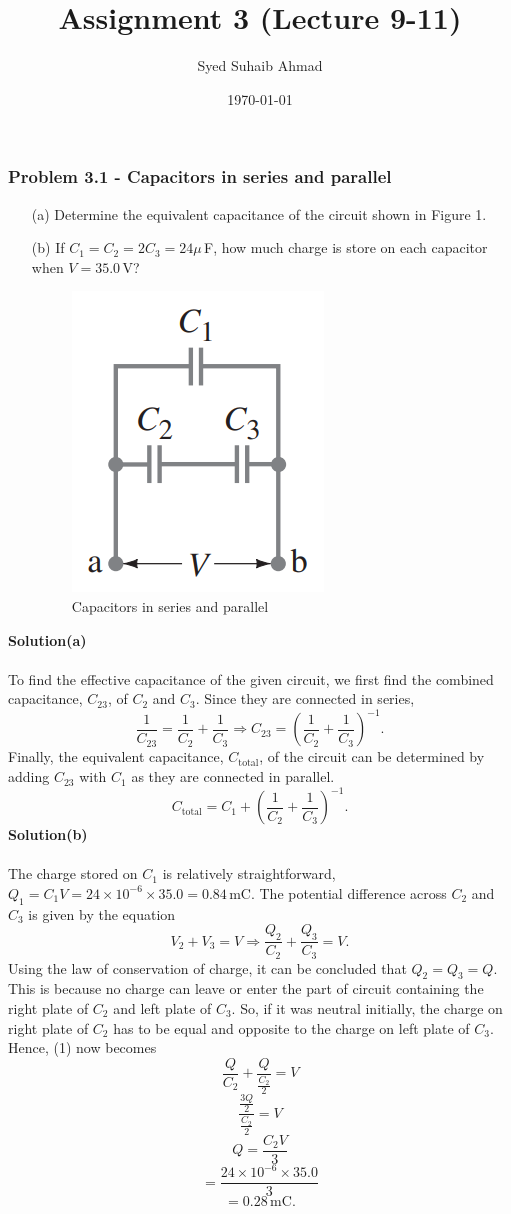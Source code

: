 \documentclass{article}
\title{Assignment \textbf{3} (Lecture 9-11)
}
\author{Syed Suhaib Ahmad}
\date{\today}
\begin{document}
\maketitle


\subsubsection*{Problem 3.1 - Capacitors in series and parallel}
\begin{enumerate}
    \item[(a)]Determine the equivalent capacitance of the circuit
shown in Figure 1.
    \item[(b)]If $C_1=C_2=2C_3=24\mu\,$F, how much charge is store on each capacitor when $V=35.0\,$V?
    \begin{figure}[h]
        \centering
        \includegraphics[width=0.2\linewidth]{figs/fig_prob_3.1.png}
        \caption{Capacitors in series and parallel}
        \label{fig: }
    \end{figure}
\end{enumerate}
\textbf{Solution(a)}
\\
\\To find the effective capacitance of the given circuit, we first find the combined capacitance, $C_{23}$, of $C_2$ and $C_3$. Since they are connected in series,
\[\frac{1}{C_{23}}=\frac{1}{C_2}+\frac{1}{C_3}\Rightarrow C_{23}=\left(\frac{1}{C_2}+\frac{1}{C_3}\right)^{-1}.\]
Finally, the equivalent capacitance, $C_{\text{total}}$, of the circuit can be determined by adding $C_{23}$ with $C_1$ as they are connected in parallel.
\[C_{\text{total}}=C_1+\left(\frac{1}{C_2}+\frac{1}{C_3}\right)^{-1}.\]
\textbf{Solution(b)}
\\
\\The charge stored on $C_1$ is relatively straightforward, $Q_1=C_1V=24\times10^{-6}\times35.0=0.84\,$mC.
The potential difference across $C_2$ and $C_3$ is given by the equation
\begin{equation}
    V_2+V_3=V\Rightarrow \frac{Q_2}{C_2}+\frac{Q_3}{C_3}=V.
\end{equation}
Using the law of conservation of charge, it can be concluded that $Q_2=Q_3=Q$. This is because no charge can leave or enter the part of circuit containing the right plate of $C_2$ and left plate of $C_3$. So, if it was neutral initially, the charge on right plate of $C_2$ has to be equal and opposite to the charge on left plate of $C_3$. Hence, (1) now becomes
\[\frac{Q}{C_2}+\frac{Q}{\frac{C_2}{2}}=V\]
\[\frac{\frac{3Q}{2}}{\frac{C_2}{2}}=V\]
\[Q=\frac{C_2V}{3}\]
\[=\frac{24\times10^{-6}\times35.0}{3}\]
\[=0.28\,\text{mC}.\]
\newpage
\end{document}
